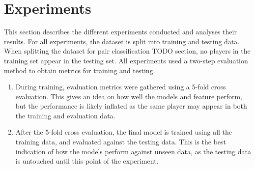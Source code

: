 \documentclass[Report.tex]{subfiles}
\begin{document}
\section{Experiments}
This section describes the different experiments conducted and analyses their results. For all experiments, the dataset is split into training and testing data. When splitting the dataset for pair classification TODO section, no players in the training set appear in the testing set. All experiments used a two-step evaluation method to obtain metrics for training and testing.
\begin{enumerate}
\item During training, evaluation metrics were gathered using a 5-fold cross evaluation. This gives an idea on how well the models and feature perform, but the performance is likely inflated as the same player may appear in both the training and evaluation data. 
\item After the 5-fold cross evaluation, the final model is trained using all the training data, and evaluated against the testing data. This is the best indication of how the models perform against unseen data, as the testing data is untouched until this point of the experiment. 
\end{enumerate}
\end{document}
